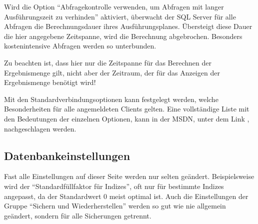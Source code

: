         Wird die Option \enquote{Abfragekontrolle verwenden, um Abfragen mit
        langer Ausführungszeit zu verhinden} aktiviert, überwacht der SQL
        Server f\"ur alle Abfragen die Berechnungsdauer ihres Ausführungsplanes.
        Übersteigt diese Dauer die hier angegebene Zeitspanne,
        wird die Berechnung abgebrochen. Besonders kostenintensive Abfragen
        werden so unterbunden.
        \begin{merke}
          Zu beachten ist, dass hier nur die Zeitspanne f\"ur das Berechnen der
          Ergebnismenge gilt, nicht aber der Zeitraum, der f\"ur das Anzeigen
          der Ergebnismenge benötigt wird!
        \end{merke}
        
        Mit den Standardverbindungsoptionen kann festgelegt werden, welche
        Besonderheiten f\"ur alle angemeldeten Clients gelten. Eine vollständige
        Liste mit den Bedeutungen der einzelnen Optionen, kann in der MSDN,
        unter dem Link \parencite{ms180124}, nachgeschlagen werden.          
        \begin{literaturinternet}
          \item \cite{ms180124}
        \end{literaturinternet}          
      \subsection{Datenbankeinstellungen}
        Fast alle Einstellungen auf dieser Seite werden nur selten geändert.
        Beispielsweise wird der \enquote{Standardfüllfaktor f\"ur Indizes}, oft
        nur f\"ur bestimmte Indizes angepasst, da der Standardwert 0 meist
        optimal ist. Auch die Einstellungen der Gruppe \enquote{Sichern und
        Wiederherstellen} werden so gut wie nie allgemein geändert, sondern f\"ur
        alle Sicherungen getrennt.
        \begin{literaturinternet}
          \item \cite{ms178521}
        \end{literaturinternet}          
